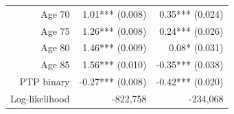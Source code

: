 \documentclass[]{article}
\begin{document}
\begin{longtable}[c]{@{}rrr@{}}
\begin{minipage}[t]{0.24\columnwidth}
Age 70
\strut\end{minipage} &
\begin{minipage}[t]{0.24\columnwidth}\raggedleft\strut
1.01*** (0.008)
\strut\end{minipage} &
\begin{minipage}[t]{0.24\columnwidth}\raggedleft\strut
0.35*** (0.024)
\strut\end{minipage}\tabularnewline
\begin{minipage}[t]{0.24\columnwidth}\raggedleft\strut
Age 75
\strut\end{minipage} &
\begin{minipage}[t]{0.24\columnwidth}\raggedleft\strut
1.26*** (0.008)
\strut\end{minipage} &
\begin{minipage}[t]{0.24\columnwidth}\raggedleft\strut
0.24*** (0.026)
\strut\end{minipage}\tabularnewline
\begin{minipage}[t]{0.24\columnwidth}\raggedleft\strut
Age 80
\strut\end{minipage} &
\begin{minipage}[t]{0.24\columnwidth}\raggedleft\strut
1.46*** (0.009)
\strut\end{minipage} &
\begin{minipage}[t]{0.24\columnwidth}\raggedleft\strut
0.08* (0.031)
\strut\end{minipage}\tabularnewline
\begin{minipage}[t]{0.24\columnwidth}\raggedleft\strut
Age 85
\strut\end{minipage} &
\begin{minipage}[t]{0.24\columnwidth}\raggedleft\strut
1.56*** (0.010)
\strut\end{minipage} &
\begin{minipage}[t]{0.24\columnwidth}\raggedleft\strut
-0.35*** (0.038)
\strut\end{minipage}\tabularnewline
\begin{minipage}[t]{0.24\columnwidth}\raggedleft\strut
PTP binary
\strut\end{minipage} &
\begin{minipage}[t]{0.24\columnwidth}\raggedleft\strut
-0.27*** (0.008)
\strut\end{minipage} &
\begin{minipage}[t]{0.24\columnwidth}\raggedleft\strut
-0.42*** (0.020)
\strut\end{minipage}\tabularnewline
\begin{minipage}[t]{0.24\columnwidth}\raggedleft\strut
Log-likelihood
\strut\end{minipage} &
\begin{minipage}[t]{0.24\columnwidth}\raggedleft\strut
-822,758
\strut\end{minipage} &
\begin{minipage}[t]{0.24\columnwidth}\raggedleft\strut
-234,068
\strut\end{minipage}\tabularnewline
\bottomrule
\end{longtable}
\end{document}
